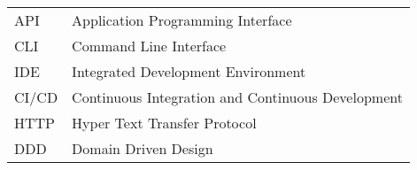 \begin{longtable}{p{3cm}p{10cm}}
    API&Application Programming Interface\\
    CLI&Command Line Interface\\
    IDE&Integrated Development Environment\\
    CI/CD&Continuous Integration and Continuous Development\\
    HTTP&Hyper Text Transfer Protocol\\
    DDD&Domain Driven Design\\
\end{longtable}
\addtocounter{table}{-1}
